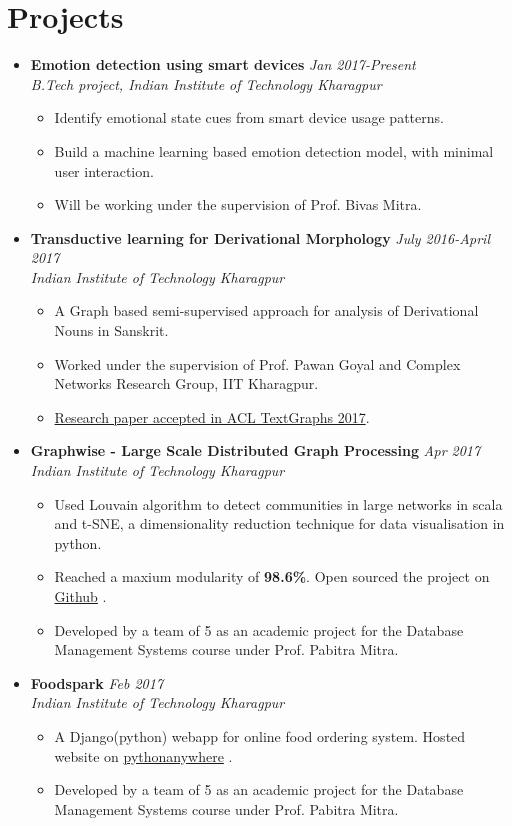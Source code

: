 \documentclass[10pt,a4paper]{moderncv}
\newcommand{\experience}[4]{
  \vspace{0.1cm}
  \item \textbf{\large{#1}} \hfill\textit{#3}\\\textit{#2}
  \begin{itemize}[leftmargin=*]
    \setlength\itemsep{0em} #4
  \end{itemize}
}
\newcommand{\newlink}[2]{
  \href{#1}{\color{blue}#2}
}
\begin{document}
\vspace{-0.1cm}
\section*{Projects}
\begin{itemize}
  \setlength\itemsep{0.5em}

  \experience{Emotion detection using smart devices}{B.Tech project, Indian Institute of Technology Kharagpur}{Jan 2017-Present}{
  	\item Identify emotional state cues from smart device usage patterns.
  	\item Build a machine learning based emotion detection model, with minimal user interaction.
  	\item Will be working under the supervision of Prof. Bivas Mitra.
  }

  \experience{Transductive learning for Derivational Morphology}{Indian Institute of Technology Kharagpur}{July 2016-April 2017}{
    \item A Graph based semi-supervised approach for analysis of Derivational Nouns in Sanskrit.
    \item	Worked under the supervision of Prof. Pawan Goyal and Complex Networks Research Group, IIT Kharagpur.
    \item \href{https://scholar.google.co.in/citations?view_op=view_citation&hl=en&user=9iIiFjMAAAAJ&citation_for_view=9iIiFjMAAAAJ:u5HHmVD_uO8C}{Research paper accepted in ACL TextGraphs 2017}.
  }

  \experience{Graphwise - Large Scale Distributed Graph Processing}{Indian Institute of Technology Kharagpur}{Apr 2017}{
  	\item Used Louvain algorithm to detect communities in large networks in scala and t-SNE, a dimensionality reduction technique for data visualisation in python.
  	\item Reached a maxium modularity of \textbf{98.6\%}. Open sourced the project on \newlink{https://github.com/kaustubhhiware/Graphwise}{Github}.
  	\item Developed by a team of 5 as an academic project for the Database Management Systems course under Prof. Pabitra Mitra.
  }

  \experience{Foodspark}{Indian Institute of Technology Kharagpur}{Feb 2017}{
  	\item A Django(python) webapp for online food ordering system. Hosted website on \newlink{http://foodkgp.pythonanywhere.com/}{pythonanywhere}.
  	\item Developed by a team of 5 as an academic project for the Database Management Systems course under Prof. Pabitra Mitra.
  }
 

\end{itemize}
\end{document}
